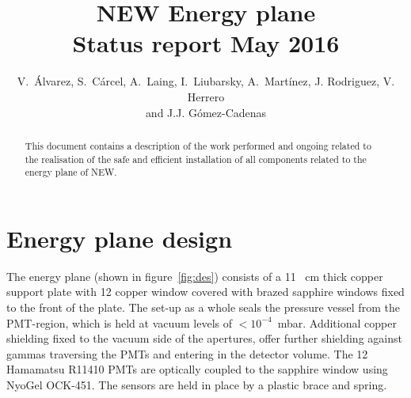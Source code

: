 \documentclass{article}
\title{NEW Energy plane\\ Status report May 2016}
\author{V.~\'Alvarez, S.~C\'arcel, A.~Laing,
  I.~Liubarsky, A.~Mart\'inez, J. Rodriguez, V. Herrero \\ and J.J. G\'omez-Cadenas}
\begin{document}
\maketitle

\begin{abstract}
  This document contains a description of the work performed and
  ongoing related to the realisation of the safe and efficient installation of all components related to the energy plane of NEW.
\end{abstract}

\newpage

\tableofcontents

\newpage

\section{Energy plane design}
\label{sec:design}
The energy plane (shown in figure~\ref{fig:des})
consists of a 11 ~cm thick copper support plate with 12 copper window
covered with brazed sapphire windows fixed to the front of the plate. The
set-up as a whole seals the pressure vessel from the PMT-region,
which is held at vacuum levels of
$<10^{-4}$~mbar. Additional copper shielding fixed to the
vacuum side of the apertures, offer further shielding against gammas traversing the PMTs and
entering in the detector volume. The 12 Hamamatsu R11410 PMTs are optically coupled to 
the sapphire window using NyoGel OCK-451. The sensors are held in place by a plastic brace and spring.
\end{document}
